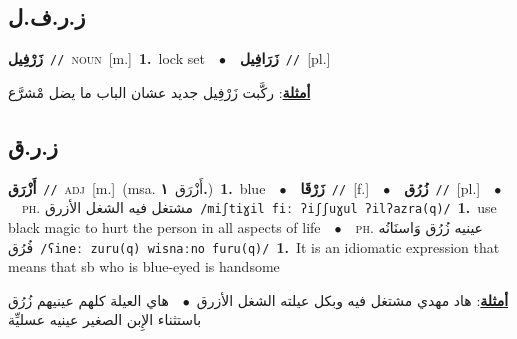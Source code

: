 \documentclass[10pt,a4paper,twoside]{article} %
\begin{document}
\begin{multicols}{2}
\vspace{-3mm}
\subsection*{\color{blue}\foreignlanguage{arabic}{ز.ر.ف.ل}\color{blue}{ (ntws)}} 

{\setlength\topsep{0pt}\textbf{\foreignlanguage{arabic}{زَرْفِيل}}\ {\color{gray}\texttt{//}\color{black}}\ \textsc{noun}\ [m.]\ \textbf{1.}~lock set\ \ $\bullet$\ \ \setlength\topsep{0pt}\textbf{\foreignlanguage{arabic}{زَرَافِيل}}\ {\color{gray}\texttt{//}\color{black}}\ [pl.]\  \begin{flushright}\color{gray}\foreignlanguage{arabic}{\textbf{\underline{\foreignlanguage{arabic}{أمثلة}}}: ركَّبت زَرْفِيل جديد عشان الباب ما يضل مْشرَّع}\end{flushright}\color{black}} \vspace{2mm}

\vspace{-3mm}
\subsection*{\color{blue}\foreignlanguage{arabic}{ز.ر.ق}\color{blue}{}} 

{\setlength\topsep{0pt}\textbf{\foreignlanguage{arabic}{أَزْرَق}}\ {\color{gray}\texttt{//}\color{black}}\ \textsc{adj}\ [m.]\ \color{gray}(msa. \foreignlanguage{arabic}{أَزْرَق}~\foreignlanguage{arabic}{\textbf{١.}})\color{black}\ \textbf{1.}~blue\ \ $\bullet$\ \ \setlength\topsep{0pt}\textbf{\foreignlanguage{arabic}{زَرْقَا}}\ {\color{gray}\texttt{//}\color{black}}\ [f.]\ \ $\bullet$\ \ \setlength\topsep{0pt}\textbf{\foreignlanguage{arabic}{زُرُق}}\ {\color{gray}\texttt{//}\color{black}}\ [pl.]\ \ $\bullet$\ \ \textsc{ph.} \color{gray} \foreignlanguage{arabic}{مشتغل فيه الشغل الأزرق}\color{black}\ {\color{gray}\texttt{/{\sffamily miʃtiɣil fiː ʔiʃʃuɣul ʔilʔazra(q)}/}\color{black}}\ \textbf{1.}~use black magic to hurt the person in all aspects of life\ \ $\bullet$\ \ \textsc{ph.} \color{gray} \foreignlanguage{arabic}{عينيه زُرُق وَاسنَانُه فُرُق}\color{black}\ {\color{gray}\texttt{/{\sffamily ʕineː zuru(q) wisnaːno furu(q)}/}\color{black}}\ \textbf{1.}~It is an idiomatic expression that means that sb who is blue-eyed is handsome\  \begin{flushright}\color{gray}\foreignlanguage{arabic}{\textbf{\underline{\foreignlanguage{arabic}{أمثلة}}}: هاد مهدي مشتغل فيه وبكل عيلته الشغل الأزرق\ $\bullet$\ \  هاي العيلة كلهم عينيهم زُرُق باستثناء الإِبن الصغير عينيه عسليِّة}\end{flushright}\color{black}} \vspace{2mm}


\end{multicols}
\end{document}
